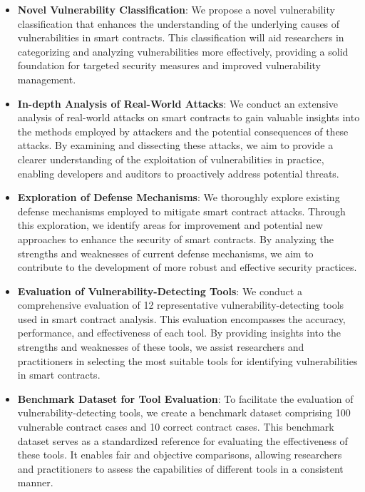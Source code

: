 \documentclass[manuscript,screen]{acmart}
\begin{document}
\begin{itemize}
  \item{\textbf{Novel Vulnerability Classification}:} We propose a novel vulnerability classification that enhances the understanding of the underlying causes of vulnerabilities in smart contracts. This classification will aid researchers in categorizing and analyzing vulnerabilities more effectively, providing a solid foundation for targeted security measures and improved vulnerability management.
  
  \item{\textbf{In-depth Analysis of Real-World Attacks}:} We conduct an extensive analysis of real-world attacks on smart contracts to gain valuable insights into the methods employed by attackers and the potential consequences of these attacks. By examining and dissecting these attacks, we aim to provide a clearer understanding of the exploitation of vulnerabilities in practice, enabling developers and auditors to proactively address potential threats.
  
  \item{\textbf{Exploration of Defense Mechanisms}:} We thoroughly explore existing defense mechanisms employed to mitigate smart contract attacks. Through this exploration, we identify areas for improvement and potential new approaches to enhance the security of smart contracts. By analyzing the strengths and weaknesses of current defense mechanisms, we aim to contribute to the development of more robust and effective security practices.
  
  \item{\textbf{Evaluation of Vulnerability-Detecting Tools}:} We conduct a comprehensive evaluation of 12 representative vulnerability-detecting tools used in smart contract analysis. This evaluation encompasses the accuracy, performance, and effectiveness of each tool. By providing insights into the strengths and weaknesses of these tools, we assist researchers and practitioners in selecting the most suitable tools for identifying vulnerabilities in smart contracts.

  \item{\textbf{Benchmark Dataset for Tool Evaluation}:} To facilitate the evaluation of vulnerability-detecting tools, we create a benchmark dataset comprising 100 vulnerable contract cases and 10 correct contract cases. This benchmark dataset serves as a standardized reference for evaluating the effectiveness of these tools. It enables fair and objective comparisons, allowing researchers and practitioners to assess the capabilities of different tools in a consistent manner.
\end{itemize}
\end{document}
